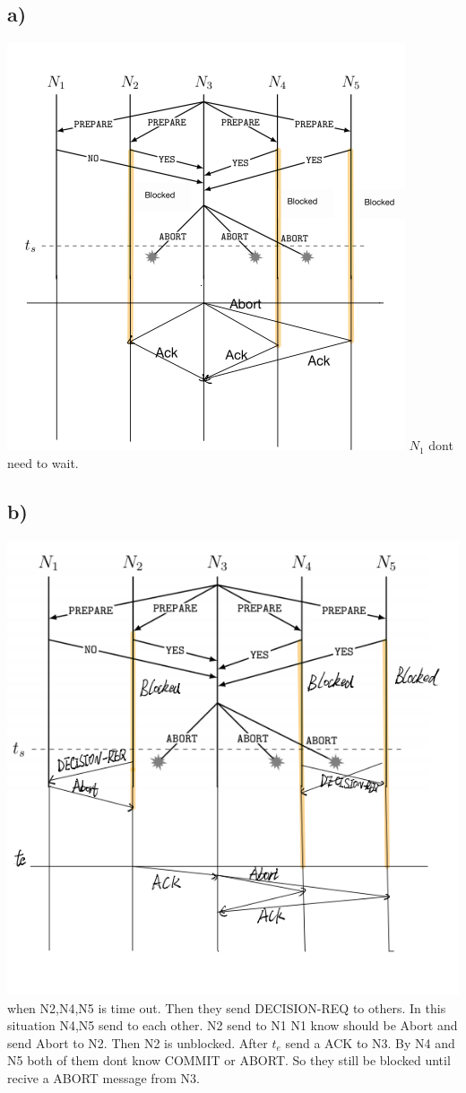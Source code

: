 \documentclass{article}
\begin{document}
\subsection*{a)}
\includegraphics[scale=0.8]{04.png}
 $N_1$ dont need to wait.
 \subsection*{b)}
  \includegraphics[scale=0.8]{05.png}
  \\when N2,N4,N5 is time out. Then they send DECISION-REQ to others. In this situation N4,N5 send to each other. N2 send to N1
  N1 know should be Abort and send Abort to N2. Then N2 is unblocked. After $t_e$ send a ACK to N3. By N4 and N5 both of them 
  dont know COMMIT or ABORT. So they still be blocked until recive a ABORT message from N3.
\end{document}
